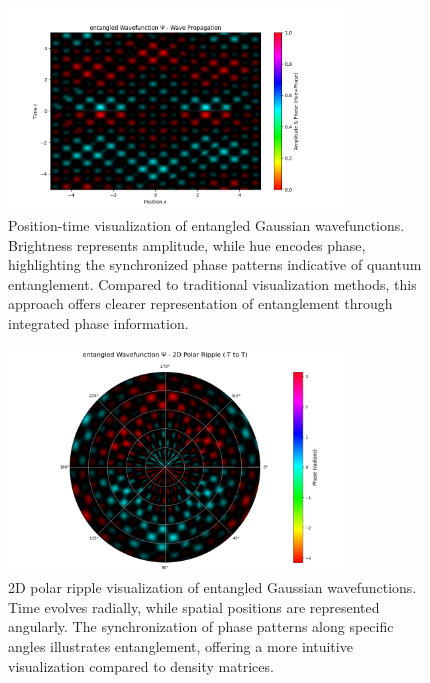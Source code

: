 \documentclass[12pt]{article}
\begin{document}
\begin{figure}[H]
\centering
\includegraphics[width=0.8\textwidth]{images/entangled_wavefunction_probability_density_with_phase.png}
\caption{Position-time visualization of entangled Gaussian wavefunctions. Brightness represents amplitude, while hue encodes phase, highlighting the synchronized phase patterns indicative of quantum entanglement. Compared to traditional visualization methods, this approach offers clearer representation of entanglement through integrated phase information.}
\label{fig:entangled}
\end{figure}

\begin{figure}[H]
\centering
\includegraphics[width=0.8\textwidth]{images/entangled_wavefunction_2d_polar_probability_density_with_phase.png}
\caption{2D polar ripple visualization of entangled Gaussian wavefunctions. Time evolves radially, while spatial positions are represented angularly. The synchronization of phase patterns along specific angles illustrates entanglement, offering a more intuitive visualization compared to density matrices.}
\label{fig:entangled_2d_polar}
\end{figure}
\end{document}
